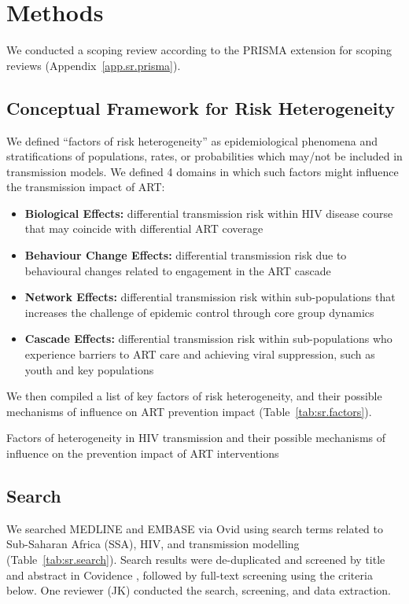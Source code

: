 \section{Methods}\label{sr.meth}
We conducted a scoping review according to the PRISMA extension for scoping reviews
(Appendix~\ref{app.sr.prisma}).
\subsection{Conceptual Framework for Risk Heterogeneity}\label{sr.meth.fw}
We defined ``factors of risk heterogeneity'' as
epidemiological phenomena and stratifications of populations, rates, or probabilities
which may/not be included in transmission models.
We defined 4 domains in which such factors might influence the transmission impact of ART:
\begin{itemize}
  \item \textbf{Biological Effects:}
  differential transmission risk within HIV disease course
  that may coincide with differential ART coverage
  \cite{Pilcher2004}
  \item \textbf{Behaviour Change Effects:}
  differential transmission risk due to
  behavioural changes related to engagement in the ART cascade
  \cite{Ramachandran2016,Tiwari2020}
  \item \textbf{Network Effects:}
  differential transmission risk within sub-populations
  that increases the challenge of epidemic control through core group dynamics
  \cite{Boily1997,Watts2010,Dodd2010}
  \item \textbf{Cascade Effects:}
  differential transmission risk within sub-populations
  who experience barriers to ART care and achieving viral suppression,
  such as youth and key populations
  \cite{Mountain2014,Lancaster2016,Hakim2018,Green2020}
\end{itemize}
We then compiled a list of key factors of risk heterogeneity,
and their possible mechanisms of influence on ART prevention impact (Table~\ref{tab:sr.factors}).
\begin{sidewaystable}
  \centering
  \caption{Factors of heterogeneity in HIV transmission
  and their possible mechanisms of influence on the prevention impact of ART interventions}
  \label{tab:sr.factors}
  
\end{sidewaystable}
\subsection{Search}\label{sr.meth.search}
We searched MEDLINE and EMBASE via Ovid
using search terms related to Sub-Saharan Africa (SSA), HIV, and transmission modelling
(Table~\ref{tab:sr.search}).
Search results were de-duplicated and screened by title and abstract in Covidence \cite{Covidence},
followed by full-text screening using the criteria below.
One reviewer (JK) conducted the search, screening, and data extraction.
